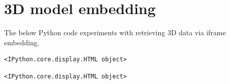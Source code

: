\documentclass[
  letterpaper,
]{book}
\begin{document}
\hypertarget{d-model-embedding}{%
\section{3D model embedding}\label{d-model-embedding}}

The below Python code experiments with retrieving 3D data via iframe
embedding.

\begin{verbatim}
<IPython.core.display.HTML object>
\end{verbatim}

\begin{verbatim}
<IPython.core.display.HTML object>
\end{verbatim}


\backmatter
\end{document}
